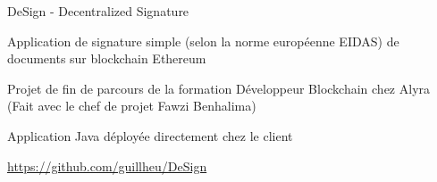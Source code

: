 \begin{cventries}
{      }
  \cventry
    {} %
    {DeSign - Decentralized Signature} %
    {} %
    {} %
    {
      \begin{cvitems} %
        \item {Application de signature simple (selon la norme européenne EIDAS) de documents sur blockchain Ethereum}
        \item {Projet de fin de parcours de la formation Développeur Blockchain chez Alyra (Fait avec le chef de projet Fawzi Benhalima)}
        \item {Application Java déployée directement chez le client}
        \item {\href{https://github.com/guillheu/DeSign}{https://github.com/guillheu/DeSign}}
      \end{cvitems}
    }
 

\end{cventries}
